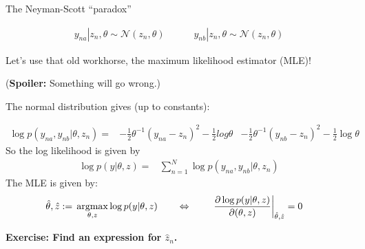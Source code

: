 \begin{frame}{The Neyman-Scott ``paradox''}

\begin{align*}
    y_{na} | z_n, \theta \sim{} \mathcal{N}(z_n, \theta) \quad\quad\quad
    y_{nb} | z_n, \theta \sim{} \mathcal{N}(z_n, \theta)
\end{align*}

Let's use that old workhorse, the maximum likelihood estimator (MLE)!

(\textbf{Spoiler:} Something will go wrong.)

\pause

The normal distribution gives (up to constants):

%
\begin{align*}
%
\log p(y_{na}, y_{nb} | \theta, z_n) ={}&
-\frac{1}{2} \theta^{-1} \left( y_{na}  - z_n\right)^2 - \frac{1}{2}log \theta
&-\frac{1}{2} \theta^{-1} \left( y_{nb}  - z_n\right)^2 - \frac{1}{2}\log \theta
%
\end{align*}
%
\pause
%
So the log likelihood is given by
\begin{align*}
%
\log p(y | \theta, z) ={}&
\sum_{n=1}^N \log p(y_{na}, y_{nb} | \theta, z_n)
%
\end{align*}
%
The MLE is given by:
%
\begin{align*}
%
\hat\theta, \hat{z} :={}& \argmax_{\theta, z}  \log p(y | \theta, z)
\quad\quad\Leftrightarrow{}\quad\quad
\fracat{\partial \log p(y | \theta, z)}{\partial (\theta, z)}{\thetahat, \hat{z}} ={} 0
%
\end{align*}
%

\pause
\hrulefill

\textbf{Exercise: Find an expression for $\hat{z}_n$.}

\end{frame}





